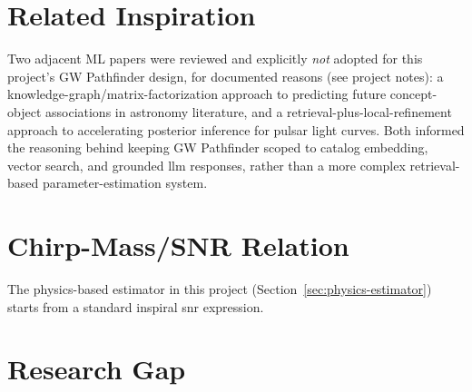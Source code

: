 \section{Related Inspiration}


Two adjacent ML papers were reviewed and explicitly \emph{not} adopted for this project's GW Pathfinder design, for documented reasons (see project notes): a knowledge-graph/matrix-factorization approach to predicting future concept-object associations in astronomy literature, and a retrieval-plus-local-refinement approach to accelerating posterior inference for pulsar light curves. Both informed the reasoning behind keeping GW Pathfinder scoped to catalog embedding, vector search, and grounded \gls{llm} responses, rather than a more complex retrieval-based parameter-estimation system.

\section{Chirp-Mass/SNR Relation}

The physics-based estimator in this project (Section~\ref{sec:physics-estimator}) starts from a standard inspiral \gls{snr} expression. %

\section{Research Gap}

